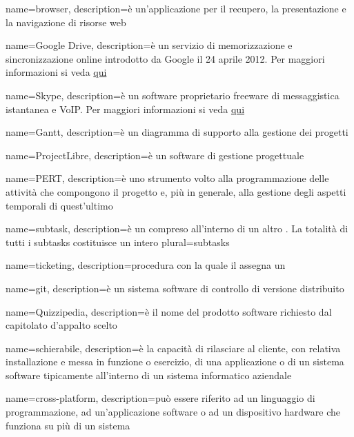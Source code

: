  {
	name=browser,
	description={è un'applicazione per il recupero, la presentazione e la navigazione di risorse web}
}

 {
	name=Google Drive,
	description={è un servizio di memorizzazione e sincronizzazione online introdotto da Google il 24 aprile 2012. Per maggiori informazioni si veda \href{https://it.wikipedia.org/wiki/Google_Drive}{qui}}
}

 {
	name=Skype,
	description={è un software proprietario freeware di messaggistica istantanea e VoIP. Per maggiori informazioni si veda \href{https://it.wikipedia.org/wiki/Skype}{qui}}
}

 {
	name=Gantt,
	description={è un diagramma di supporto alla gestione dei progetti}
}

 {
	name=ProjectLibre,
	description={è un software di gestione progettuale}
}

 {
	name=PERT,
	description={è uno strumento volto alla programmazione delle attività che compongono il progetto e, più in generale, alla gestione degli aspetti temporali di quest'ultimo}
}

 {
	name=subtask,
	description={è un  compreso all'interno di un altro . La totalità di tutti i subtasks costituisce un intero }
	plural=subtasks
}

 {
	name=ticketing,
	description={procedura con la quale il \RE assegna un }
}

 {
	name=git,
	description={è un sistema software di controllo di versione distribuito}
}

 {
	name=Quizzipedia,
	description={è il nome del prodotto software richiesto dal capitolato d'appalto scelto}
}

 {
	name=schierabile,
	description={è la capacità di rilasciare al cliente, con relativa installazione e messa in funzione o esercizio, di una applicazione o di un sistema software tipicamente all'interno di un sistema informatico aziendale}
}

 {
	name=cross-platform,
	description={può essere riferito ad un linguaggio di programmazione, ad un'applicazione software o ad un dispositivo hardware che funziona su più di un sistema}
}

